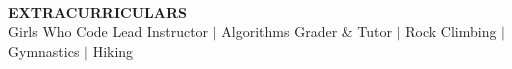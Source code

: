 \documentclass[11pt]{article}
\newcommand{\wrapTitle}[1]{{\sectionNL \textbf{\Large #1}} \sectionNL}
\newcommand{\vb}{ $\mid$ }
\newcommand{\sectionNL}{~\\[1pt]}
\newcommand{\customtab}{$\hspace{10pt} \bullet \hspace{2pt}$}
\newcommand{\customtabinline}{$\hspace{23pt}$}
\newcommand{\HMC}{HMC}
\newcommand{\rightAlign}{\hfill}
\begin{document}






\begin{flushleft}
\wrapTitle{EXTRACURRICULARS}
\normalsize
Girls Who Code Lead Instructor
 \vb Algorithms Grader \& Tutor
 \vb Rock Climbing
 \vb Gymnastics
 \vb Hiking
\end{flushleft}

\end{document}
